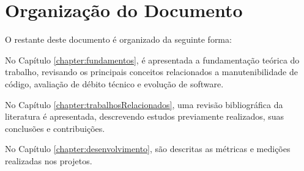 \section{Organização do Documento}

O restante deste documento é organizado da seguinte forma:


No Capítulo \ref{chapter:fundamentos}, é apresentada a fundamentação teórica do trabalho, revisando
os principais conceitos relacionados a manutenibilidade de código, avaliação de débito técnico e evolução de software.

No Capítulo \ref{chapter:trabalhosRelacionados}, uma revisão bibliográfica da literatura é apresentada, descrevendo estudos previamente realizados, suas conclusões e 
contribuições.

No Capítulo \ref{chapter:desenvolvimento}, são descritas as métricas e medições realizadas nos projetos.